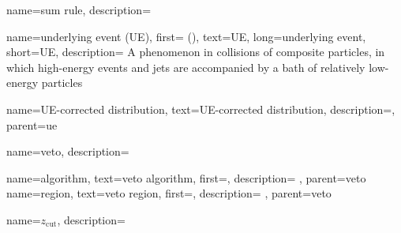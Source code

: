 {
  name=sum rule,
  description={}
}


{
  name=underlying event (UE),
  first= (),
  text=UE,
  long=underlying event,
  short=UE,
  description={
      A phenomenon in collisions of composite particles, in which high-energy events and jets are accompanied by a bath of relatively low-energy particles
  }
}

{
    name=UE-corrected distribution,
    text=UE-corrected distribution,
    description={},
    parent=ue
}


{
    name=veto,
    description={}
}

{
    name=algorithm,
    text=veto algorithm,
    first=,
    description={
    },
    parent=veto
}
{
    name=region,
    text=veto region,
    first=,
    description={
    },
    parent=veto
}

{
  name=\ensuremath{z_{\text{cut}}},
  description={}
}
